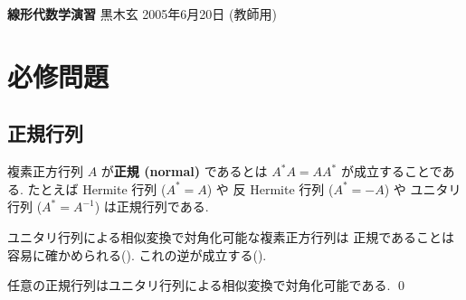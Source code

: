 \documentclass[12pt,twoside]{jarticle}
\newcommand\commentout[1]{#1}
\newcommand\commentout[1]{}
\begin{document}

%
%



\noindent
{\Large\bf 線形代数学演習}
\hfill
{\large 黒木玄}
\qquad
2005年6月20日
\commentout{\quad (教師用)}


\tableofcontents

\newpage

\section{必修問題}


\subsection{正規行列}

複素正方行列 $A$ が{\bf 正規 (normal)} であるとは $A^*A=AA^*$ 
が成立することである. 
たとえば Hermite 行列 ($A^*=A$) や
反 Hermite 行列 ($A^*=-A$) や
ユニタリ行列 ($A^*=A^{-1}$) は正規行列である.

ユニタリ行列による相似変換で対角化可能な複素正方行列は
正規であることは容易に確かめられる().
これの逆が成立する().

\begin{theorem}
  任意の正規行列はユニタリ行列による相似変換で対角化可能である. \qed
\end{theorem}
\end{document}
